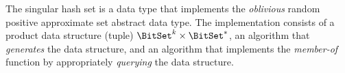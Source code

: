 \documentclass[ ../main.tex]{subfiles}
\begin{document}
The singular hash set is a data type that implements the \emph{oblivious} random 
positive approximate set abstract data type.
The implementation consists of a  product data structure (tuple) $\BitSet^k \times \BitSet^{*}$, an algorithm 
that \emph{generates} the data structure, and an algorithm that implements the \emph{member-of} function by appropriately \emph{querying} the data structure.


%
%
%
\end{document}

